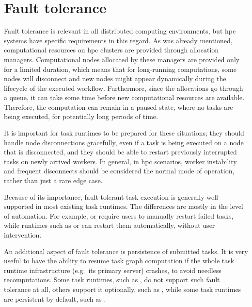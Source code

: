 \section{Fault tolerance}
Fault tolerance is relevant in all distributed computing environments, but \gls{hpc}
systems have specific requirements in this regard. As was already mentioned, computational
resources on \gls{hpc} clusters are provided through allocation managers.
Computational nodes allocated by these managers are provided only for a limited duration, which
means that for long-running computations, some nodes will disconnect and new nodes might appear
dynamically during the lifecycle of the executed workflow. Furthermore, since the allocations go
through a queue, it can take some time before new computational resources are available. Therefore,
the computation can remain in a paused state, where no tasks are being executed, for potentially
long periods of time.

It is important for task runtimes to be prepared for these situations; they should handle node
disconnections gracefully, even if a task is being executed on a node that is disconnected, and
they should be able to restart previously interrupted tasks on newly arrived workers. In general,
in \gls{hpc} scenarios, worker instability and frequent disconnects should be
considered the normal mode of operation, rather than just a rare edge case.

Because of its importance, fault-tolerant task execution is generally well-supported in most
existing task runtimes. The differences are mostly in the level of automation. For example,
\fireworks{} or \merlin{} require users to manually restart failed tasks,
while runtimes such as \dask{} or \balsam{} can restart them
automatically, without user intervention.

An additional aspect of fault tolerance is persistence of submitted tasks. It is very useful to
have the ability to resume task graph computation if the whole task
runtime infrastructure (e.g.\ its primary server) crashes, to avoid needless recomputations.
Some task runtimes, such as \dask{}, do not support such fault tolerance at all, others support
it optionally, such as \ray{}, while some task runtimes are persistent by default, such as \balsam{}.

